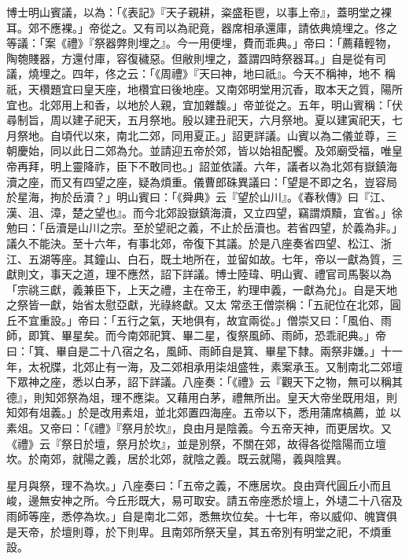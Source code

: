 \begin{pinyinscope}
 博士明山賓議，以為：「《表記》『天子親耕，粢盛秬鬯，以事上帝』，蓋明堂之裸耳。郊不應裸。」帝從之。又有司以為祀竟，器席相承還庫，請依典燒埋之。佟之等議：「案《禮》『祭器弊則埋之』。今一用便埋，費而乖典。」帝曰：「薦藉輕物，陶匏賤器，方還付庫，容復穢惡。但敝則埋之，蓋謂四時祭器耳。」自是從有司議，燒埋之。四年，佟之云：「《周禮》『天曰神，地曰祇』。今天不稱神，地不
 稱祇，天欑題宜曰皇天座，地欑宜曰後地座。又南郊明堂用沉香，取本天之質，陽所宜也。北郊用上和香，以地於人親，宜加雜馥。」帝並從之。五年，明山賓稱：「伏尋制旨，周以建子祀天，五月祭地。殷以建丑祀天，六月祭地。夏以建寅祀天，七月祭地。自頃代以來，南北二郊，同用夏正。」詔更詳議。山賓以為二儀並尊，三朝慶始，同以此日二郊為允。並請迎五帝於郊，皆以始祖配饗。及郊廟受福，唯皇帝再拜，明上靈降祚，臣下不敢同也。」詔並依議。六年，議者以為北郊有嶽鎮海瀆之座，而又有四望之座，疑為煩重。儀曹郎硃異議曰：「望是不即之名，豈容局
 於星海，拘於岳瀆？」明山賓曰：「《舜典》云『望於山川』。《春秋傳》曰『江、漢、沮、漳，楚之望也』。而今北郊設嶽鎮海瀆，又立四望，竊謂煩黷，宜省。」徐勉曰：「岳瀆是山川之宗。至於望祀之義，不止於岳瀆也。若省四望，於義為非。」議久不能決。至十六年，有事北郊，帝復下其議。於是八座奏省四望、松江、浙江、五湖等座。其鐘山、白石，既土地所在，並留如故。七年，帝以一獻為質，三獻則文，事天之道，理不應然，詔下詳議。博士陸瑋、明山賓、禮官司馬褧以為「宗祧三獻，義兼臣下，上天之禮，主在帝王，約理申義，一獻為允」。自是天地之祭皆一獻，始省太慰亞獻，光祿終獻。又太
 常丞王僧崇稱：「五祀位在北郊，圓丘不宜重設。」帝曰：「五行之氣，天地俱有，故宜兩從。」僧崇又曰：「風伯、雨師，即箕、畢星矣。而今南郊祀箕、畢二星，復祭風師、雨師，恐乖祀典。」帝曰：「箕、畢自是二十八宿之名，風師、雨師自是箕、畢星下隸。兩祭非嫌。」十一年，太祝牒，北郊止有一海，及二郊相承用柒俎盛牲，素案承玉。又制南北二郊壇下眾神之座，悉以白茅，詔下詳議。八座奏：「《禮》云『觀天下之物，無可以稱其德』，則知郊祭為俎，理不應柒。又藉用白茅，禮無所出。皇天大帝坐既用俎，則知郊有俎義。」於是改用素俎，並北郊置四海座。五帝以下，悉用蒲席槁薦，並
 以素俎。又帝曰：「《禮》『祭月於坎』，良由月是陰義。今五帝天神，而更居坎。又《禮》云『祭日於壇，祭月於坎』，並是別祭，不關在郊，故得各從陰陽而立壇坎。於南郊，就陽之義，居於北郊，就陰之義。既云就陽，義與陰異。



 星月與祭，理不為坎。」八座奏曰：「五帝之義，不應居坎。良由齊代圓丘小而且峻，邊無安神之所。今丘形既大，易可取安。請五帝座悉於壇上，外壝二十八宿及雨師等座，悉停為坎。」自是南北二郊，悉無坎位矣。十七年，帝以威仰、魄寶俱是天帝，於壇則尊，於下則卑。且南郊所祭天皇，其五帝別有明堂之祀，不煩重設。




\end{pinyinscope}
